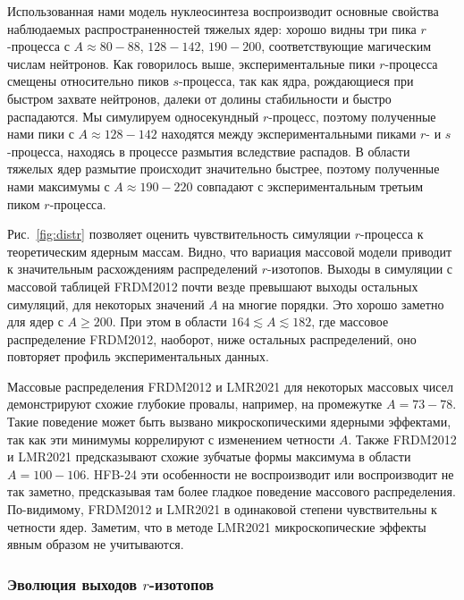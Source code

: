 Использованная нами модель нуклеосинтеза воспроизводит основные свойства наблюдаемых распространенностей тяжелых ядер: хорошо видны три пика $r$-процесса с $A \approx 80 - 88$, $128 - 142$, $190 - 200$, соответствующие магическим числам нейтронов. Как говорилось выше, экспериментальные пики $r$-процесса смещены относительно пиков $s$-процесса, так как ядра, рождающиеся при быстром захвате нейтронов, далеки от долины стабильности и быстро распадаются. Мы симулируем односекундный $r$-процесс, поэтому полученные нами пики с $A \approx 128 - 142$ находятся между экспериментальными пиками $r$- и $s$-процесса, находясь в процессе размытия вследствие распадов. В области тяжелых ядер размытие происходит значительно быстрее, поэтому полученные нами максимумы с $A \approx 190 - 220$ совпадают с экспериментальным третьим пиком $r$-процесса.

Рис.~\ref{fig:distr} позволяет оценить чувствительность симуляции $r$-процесса к теоретическим ядерным массам. Видно, что вариация массовой модели приводит к значительным расхождениям распределений $r$-изотопов. Выходы в симуляции с массовой таблицей FRDM2012 почти везде превышают выходы остальных симуляций, для некоторых значений $A$ на многие порядки. Это хорошо заметно для ядер с $A \geq 200$. При этом в области $164 \lesssim A \lesssim 182$, где массовое распределение FRDM2012, наоборот, ниже остальных распределений, оно повторяет профиль экспериментальных данных.

Массовые распределения FRDM2012 и LMR2021 для некоторых массовых чисел демонстрируют схожие глубокие провалы, например, на промежутке $A = 73 - 78$. Такие поведение может быть вызвано микроскопическими ядерными эффектами, так как эти минимумы коррелируют с изменением четности $A$. Также FRDM2012 и LMR2021 предсказывают схожие зубчатые формы максимума в области $A = 100 - 106$. HFB-24 эти особенности не воспроизводит или воспроизводит не так заметно, предсказывая там более гладкое поведение массового распределения. По-видимому, FRDM2012 и LMR2021 в одинаковой степени чувствительны к четности ядер. Заметим, что в методе LMR2021 микроскопические эффекты явным образом не учитываются.

\subsubsection{Эволюция выходов $r$-изотопов}

